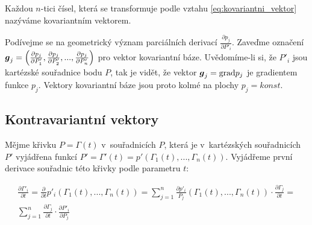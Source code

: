 Každou \(n\)-tici čísel, která se transformuje podle vztahu \eqref{eq:kovariantni_vektor} nazýváme kovariantním vektorem.

Podívejme se na geometrický význam parciálních derivací \(\frac{\partial p_j}{\partial P'_i}\). Zaveďme označení \(\boldsymbol{g}_j = \left(\frac{\partial p_j}{\partial P'_1}, \frac{\partial p_j}{\partial P'_2}, ..., \frac{\partial p_j}{\partial P'_n}\right)\) pro vektor kovariantní báze. Uvědomíme-li si, že \(P'_i\) jsou kartézské souřadnice bodu \(P\), tak je vidět, že vektor \(\boldsymbol{g}_j = \mathrm{grad} p_j\) je gradientem funkce \(p_j\). Vektory kovariantní báze jsou proto kolmé na plochy \(p_j = konst\).

 

\subsection{Kontravariantní vektory}

Mějme křivku \(P = \Gamma(t)\) v~souřadnicích \(P\), která je v~kartézských souřadnicích \(P'\) vyjádřena funkcí \(P' = \Gamma'(t) = p'(\Gamma_1(t), ..., \Gamma_n(t))\). Vyjádřeme první derivace souřadnic této křivky podle parametru \(t\):

\begin{equation}
\begin{split}
\frac{\partial \Gamma'_i}{\partial t} = \frac{\partial}{\partial t} p'_i(\Gamma_1(t), ..., \Gamma_n(t)) = \sum_{j=1}^n \frac{\partial p'_i}{P_j} (\Gamma_1(t), ..., \Gamma_n(t)) \cdot \frac{\partial \Gamma_j}{\partial t} = \\
\sum_{j=1}^n \frac{\partial \Gamma_j}{\partial t} \cdot \frac{\partial P'_i}{\partial P_j}
\end{split}
\end{equation}


